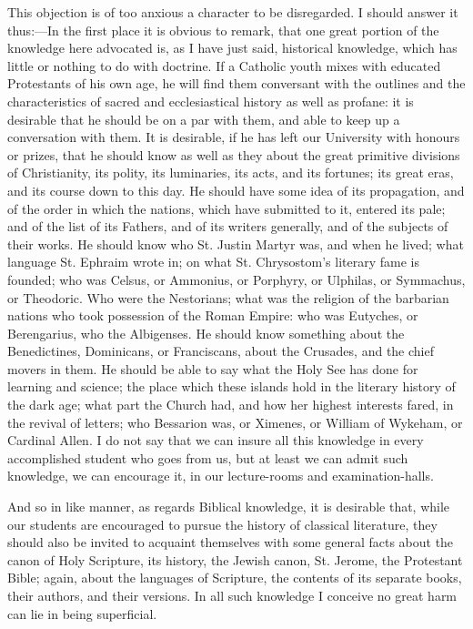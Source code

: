 This objection is of too anxious a character to be disregarded. I
should answer it thus:—In the first place it is obvious to remark,
that one great portion of the knowledge here advocated is, as I have
just said, historical knowledge, which has little or nothing to do
with doctrine. If a Catholic youth mixes with educated Protestants of
his own age, he will find them conversant with the outlines and the
characteristics of sacred and ecclesiastical history as well as
profane: it is desirable that he should be on a par with them, and
able to keep up a conversation with them. It is desirable, if he has
left our University with honours or prizes, that he should know as
well as they about the great primitive divisions of Christianity, its
polity, its luminaries, its acts, and its fortunes; its great eras,
and its course down to this day. He should have some idea of its
propagation, and of the order in which the nations, which have
submitted to it, entered its pale; and of the list of its
Fathers, and of its writers generally, and of the subjects of their
works. He should know who St. Justin Martyr was, and when he lived;
what language St. Ephraim wrote in; on what St. Chrysostom's literary
fame is founded; who was Celsus, or Ammonius, or Porphyry, or Ulphilas,
or Symmachus, or Theodoric. Who were the Nestorians; what was the
religion of the barbarian nations who took possession of the Roman
Empire: who was Eutyches, or Berengarius, who the Albigenses. He
should know something about the Benedictines, Dominicans, or
Franciscans, about the Crusades, and the chief movers in them. He
should be able to say what the Holy See has done for learning and
science; the place which these islands hold in the literary history of
the dark age; what part the Church had, and how her highest interests
fared, in the revival of letters; who Bessarion was, or Ximenes, or
William of Wykeham, or Cardinal Allen. I do not say that we can insure
all this knowledge in every accomplished student who goes from us, but
at least we can admit such knowledge, we can encourage it, in our
lecture-rooms and examination-halls.

And so in like manner, as regards Biblical knowledge, it is
desirable that, while our students are encouraged to pursue the
history of classical literature, they should also be invited to
acquaint themselves with some general facts about the canon of Holy
Scripture, its history, the Jewish canon, St. Jerome, the Protestant
Bible; again, about the languages of Scripture, the contents of its
separate books, their authors, and their versions. In all such
knowledge I conceive no great harm can lie in being superficial.

